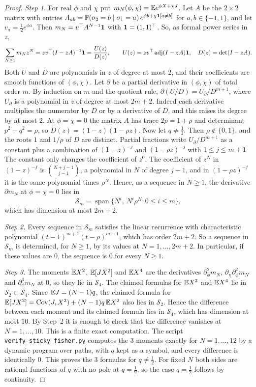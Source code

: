\begin{proof}
\emph{Step 1.} For real $\phi$ and $\chi$ put
$m_N(\phi,\chi)=\mathbb{E} e^{\phi X+\chi J}$. Let $A$ be the $2\times2$ matrix with
entries $A_{ab}=\mathbb{P}(\sigma_2=b\mid\sigma_1=a)\,e^{\phi b+\chi\mathbf
1[a\ne b]}$ for $a,b\in\{-1,1\}$, and let $v_a=\frac12e^{\phi a}$. Then
$m_N=v^\top A^{N-1}\mathbf{1}$ with $\mathbf{1}=(1,1)^\top$. So, as formal power
series in $z$,
\[
 \sum_{N\ge1}m_Nz^N=zv^\top(I-zA)^{-1}\mathbf{1}=\frac{U(z)}{D(z)},\qquad
 U(z)=zv^\top\operatorname{adj}(I-zA)\mathbf{1},\quad D(z)=\det(I-zA).
\]
Both $U$ and $D$ are polynomials in $z$ of degree at most $2$, and their
coefficients are smooth functions of $(\phi,\chi)$. Let $\partial$ be a
partial derivative in $(\phi,\chi)$ of total order $m$. By induction on $m$
and the quotient rule, $\partial(U/D)=U_\partial/D^{m+1}$, where $U_\partial$
is a polynomial in $z$ of degree at most $2m+2$. Indeed each derivative
multiplies the numerator by $D$ or by a derivative of $D$, and this raises
its degree by at most $2$. At $\phi=\chi=0$ the matrix $A$ has
trace $2p=1+\rho$ and determinant $p^2-q^2=\rho$, so
$D(z)=(1-z)(1-\rho z)$. Now let $q\ne\frac12$. Then $\rho\notin\{0,1\}$, and
the roots $1$ and $1/\rho$ of $D$ are distinct. Partial fractions write
$U_\partial/D^{m+1}$ as a constant plus a combination of $(1-z)^{-j}$ and
$(1-\rho z)^{-j}$ with $1\le j\le m+1$. The constant only changes the
coefficient of $z^0$. The coefficient of $z^N$ in $(1-z)^{-j}$ is
$\binom{N+j-1}{j-1}$, a polynomial in $N$ of degree $j-1$, and in
$(1-\rho z)^{-j}$ it is the same polynomial times $\rho^N$. Hence, as a
sequence in $N\ge1$, the derivative $\partial m_N$ at $\phi=\chi=0$ lies in
\[
 \mathcal S_m=\operatorname{span}\{N^i,\ N^i\rho^N:0\le i\le m\},
\]
which has dimension at most $2m+2$.

\emph{Step 2.} Every sequence in $\mathcal S_m$ satisfies the linear
recurrence with characteristic polynomial $(t-1)^{m+1}(t-\rho)^{m+1}$, which
has order $2m+2$. So a sequence in $\mathcal S_m$ is determined, for
$N\ge1$, by its values at $N=1,\dots,2m+2$. In particular, if these values
are $0$, the sequence is $0$ for every $N\ge1$.

\emph{Step 3.} The moments $\mathbb{E} X^2$, $\mathbb{E}[JX^2]$ and $\mathbb{E} X^4$ are the
derivatives $\partial_\phi^2m_N$, $\partial_\chi\partial_\phi^2m_N$ and
$\partial_\phi^4m_N$ at $0$, so they lie in $\mathcal S_4$. The claimed
formulas for $\mathbb{E} X^2$ and $\mathbb{E} X^4$ lie in $\mathcal S_2\subset\mathcal S_4$.
Since $\mathbb{E} J=(N-1)q$, the claimed formula for
$\mathbb{E}[JX^2]=\operatorname{Cov}(J,X^2)+(N-1)q\,\mathbb{E} X^2$ also lies in $\mathcal S_2$. Hence the
difference between each moment and its claimed formula lies in
$\mathcal S_4$, which has dimension at most $10$. By Step~2 it is enough to
check that the difference vanishes at $N=1,\dots,10$. This is a finite exact
computation. The script \texttt{verify\_sticky\_fisher.py} computes the 3
moments exactly for $N=1,\dots,12$ by a dynamic program over paths, with $q$
kept as a symbol, and every difference is identically $0$. This proves the 3
formulas for $q\ne\frac12$. For fixed $N$ both sides are rational functions
of $q$ with no pole at $q=\frac12$, so the case $q=\frac12$ follows by
continuity.


\end{proof}
